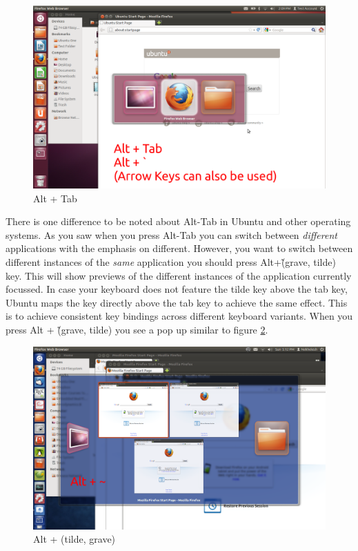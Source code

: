 \begin{figure}[ht!]	
	\centering
	\includegraphics[width=325pt]{./images/work-ubuntu/alt-tab.png}
	\caption{Alt + Tab}	
	\label{fig:alt-tab}		
\end{figure}

\par \noindent There is one difference to be noted about Alt-Tab in Ubuntu and other operating systems. As you saw when you press Alt-Tab you can switch between \emph{different} applications with the emphasis on different. However, you want to switch between different instances of the \emph{same} application you should press Alt+\~ (grave, tilde) key. This will show previews of the different instances of the application currently focussed. In case your keyboard does not feature the tilde key above the tab key, Ubuntu maps the key directly above the tab key to achieve the same effect. This is to achieve consistent key bindings across different keyboard variants. When you press Alt + \~ (grave, tilde) you see a pop up similar to figure \ref{fig:alt-grave}. \\

\begin{figure}[ht!]	
	\centering
	\includegraphics[width=325pt]{./images/work-ubuntu/alt-grave.png}
	\caption{Alt + (tilde, grave)}	
	\label{fig:alt-grave}		
\end{figure}

